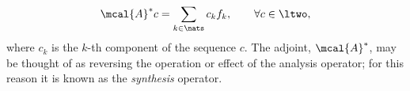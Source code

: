 \documentclass[a4paper, 12pt]{article}
\newcommand{\sumn}{\ensuremath{\sum_{k \in \nats}}\xspace}
\begin{document}
\begin{align}
  \mcal{A}^* c = \sum_{k \in \nats} c_k f_k, \qquad \forall c \in \ltwo,\notag
  \label{}
\end{align}
where $c_k$ is the $k$-th component of the sequence $c$. The adjoint, $\mcal{A}^*$, may be thought of as reversing the operation or effect of the analysis operator; for this reason it is known as the \emph{synthesis} operator.
\begin{comment}
By composing the analysis and the synthesis operators, we obtain the \emph{frame operator} $F:\LtwoR \to \LtwoR$ defined as: 
\begin{align}
  \mcal{F} f := \mcal{A}\mcal{A}^*f = \sum_{k \in \nats} \langle f, f_k \rangle f_k, \notag
\end{align}
for all $f \in \LtwoR$.
The frame operator $F$ is bounded, invertible, and self-adjoint\footnote{See \cite{Christensen2001} and the references therein.}. This yields the representation result
\begin{align}
  f = FF^{-1}f = \sumn \langle f, F^{-1} f_k\rangle f_k. \notag 
  \label{}
\end{align}
The sequence $\{F^{-1}f_k\}_{k \in \nats}$ is also a frame, and it is called the \emph{canonical dual} of $\{f_k\}_{k \in \nats}$. A frame will generally have other duals besides the canonical dual. That is, there exists  sequences $\{\tilde{f}_k\}_{k \in \nats}$ besides the canonical sequence such that 
\begin{align}
  f = \sumn \langle f, \tilde{f}_k\rangle f_k \qquad \forall f \in \LtwoR.
  \label{eq:dual}
\end{align}
\end{comment}
\end{document}
